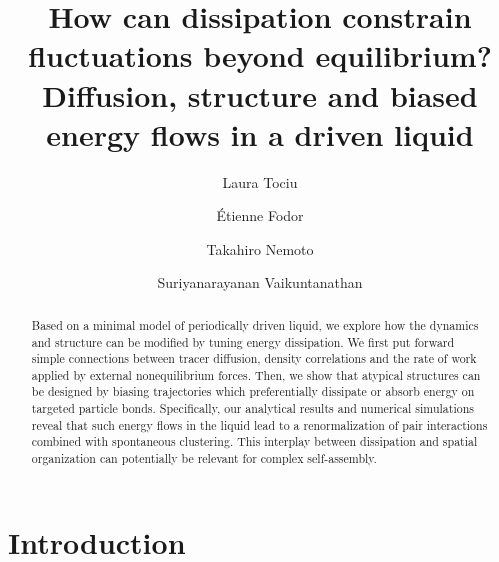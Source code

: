 \documentclass[pre, superscriptaddress, twocolumn,pre]{revtex4-1}
\begin{document}
\title{How can dissipation constrain fluctuations beyond equilibrium?\\Diffusion, structure and biased energy flows in a driven liquid}
\author{Laura Tociu}

\author{\'Etienne Fodor}

\author{Takahiro Nemoto}

\author{Suriyanarayanan Vaikuntanathan}

\begin{abstract}

Based on a minimal model of periodically driven liquid, we explore how the dynamics and structure can be modified by tuning energy dissipation. We first put forward simple connections between tracer diffusion, density correlations and the rate of work applied by external nonequilibrium forces. Then, we show that atypical structures can be designed by biasing trajectories which preferentially dissipate or absorb energy on targeted particle bonds. Specifically, our analytical results and numerical simulations reveal that such energy flows in the liquid lead to a renormalization of pair interactions combined with spontaneous clustering. This interplay between dissipation and spatial organization can potentially be relevant for complex self-assembly.

\end{abstract}

\maketitle 




\section{Introduction}
\end{document}
